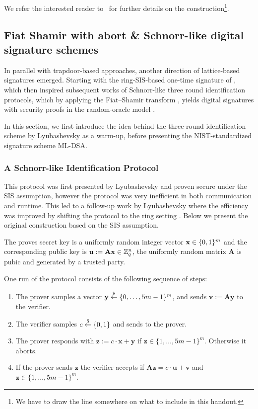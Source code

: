 We refer the interested reader to~\cite{Falcon} for further details on the construction\footnote{We have to draw the line somewhere on what to include in this handout.}.

\subsection{Fiat Shamir with abort \& Schnorr-like digital signature schemes}\label{sec:FS}
In parallel with trapdoor-based approaches, another direction of lattice-based signatures emerged. Starting with the ring-SIS-based one-time signature of \cite{TCC:LyuMic08}, which then inspired subsequent works of Schnorr-like \cite{JC:Schnorr91} three round identification protocols, which by applying the Fiat–Shamir transform \cite{C:FiaSha86}, yields digital signatures with security proofs in the random-oracle model \cite{PKC:Lyubashevsky08,EC:Lyubashevsky12}.

In this section, we first introduce the idea behind the three-round identification scheme by Lyubashevsky \cite{PKC:Lyubashevsky08} as a warm-up, before presenting the NIST-standardized signature scheme ML-DSA.

\subsubsection{A Schnorr-like Identification Protocol}
This protocol was first presented by Lyubashevsky \cite{PKC:Lyubashevsky08} and proven secure under the SIS assumption, however the protocol was very inefficient in both communication and runtime. This led to a follow-up work by Lyubashevsky where the efficiency was improved by shifting the protocol to the ring setting \cite{AC:Lyubashevsky09}. Below we present the original construction based on the SIS assumption.

The proves secret key is a uniformly random integer vector \(\mathbf{x}\in\{0,1\}^{m}\) and the corresponding public key is \(\mathbf{u}:= \mathbf{Ax}\in\mathbb{Z}_q^{n}\), the uniformly random matrix \(\mathbf{A}\) is pubic and generated by a trusted party.

One run of the protocol consists of the following sequence of steps:
\begin{enumerate}
    \item The prover samples a vector \(\mathbf{y}\overset{\$}{\leftarrow} \{0,\dots, 5m-1\}^m\), and sends \(\mathbf{v}:=\mathbf{Ay}\) to the verifier.
    \item The verifier samples \(c\overset{\$}{\leftarrow}\{0,1\}\) and sends to the prover.
    \item The prover responds with \(\mathbf{z}:= c\cdot \mathbf{x}+ \mathbf{y}\) if \(\mathbf{z}\in\{1,\dots, 5m-1\}^m\). Otherwise it aborts.
    \item If the prover sends \(\mathbf{z}\) the verifier accepts if \(\mathbf{Az} = c\cdot\mathbf{u}+\mathbf{v}\) and \(\mathbf{z}\in\{1,\dots, 5m-1\}^m\).
\end{enumerate}


